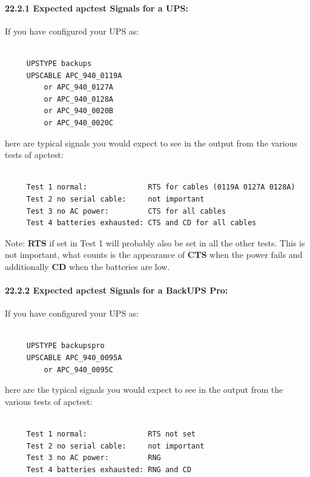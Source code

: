 \paragraph*{22.2.1 Expected apctest Signals for a UPS:}

\label{index-Testing-224}
\label{index-apctest-225}
If you have configured your UPS as: 

\footnotesize
\begin{verbatim}
     
     UPSTYPE backups
     UPSCABLE APC_940_0119A
         or APC_940_0127A
         or APC_940_0128A
         or APC_940_0020B
         or APC_940_0020C
\end{verbatim}
\normalsize

here are typical signals you would expect to see in the output from the
various tests of apctest: 

\footnotesize
\begin{verbatim}
     
     Test 1 normal:              RTS for cables (0119A 0127A 0128A)
     Test 2 no serial cable:     not important
     Test 3 no AC power:         CTS for all cables
     Test 4 batteries exhausted: CTS and CD for all cables
\end{verbatim}
\normalsize

Note: {\bf RTS} if set in Test 1 will probably also be set in all the other
tests. This is not important, what counts is the appearance of {\bf CTS} when
the power fails and additionally {\bf CD} when the batteries are low. 

\label{Expected-apctest-Signals-for-a-BackUPS-Pro}

\paragraph*{22.2.2 Expected apctest Signals for a BackUPS Pro:}

\label{index-Testing-226}
\label{index-apctest-227}
If you have configured your UPS as: 

\footnotesize
\begin{verbatim}
     
     UPSTYPE backupspro
     UPSCABLE APC_940_0095A
         or APC_940_0095C
\end{verbatim}
\normalsize

here are the typical signals you would expect to see in the output from the
various tests of apctest: 

\footnotesize
\begin{verbatim}
     
     Test 1 normal:              RTS not set
     Test 2 no serial cable:     not important
     Test 3 no AC power:         RNG
     Test 4 batteries exhausted: RNG and CD
\end{verbatim}
\normalsize

